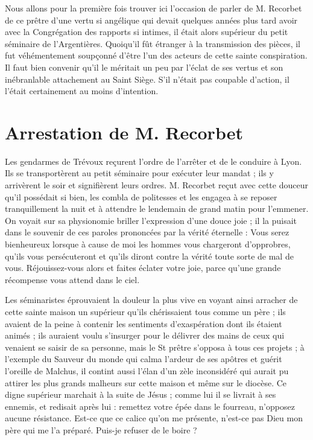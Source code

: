 Nous allons pour la première fois trouver ici l'occasion de parler de M. Recorbet de ce prêtre d'une vertu si angélique qui devait quelques années plus tard avoir avec la Congrégation des rapports si intimes, il était alors supérieur du petit séminaire de l'Argentières. Quoiqu'il fût étranger à la transmission des pièces, il fut véhémentement soupçonné d'être l'un des acteurs de cette sainte conspiration. Il faut bien convenir qu'il le méritait un peu par l'éclat de ses vertus et son inébranlable attachement au Saint Siège. S'il n'était pas coupable d'action, il l'était certainement au moins d'intention.

\section*{Arrestation de M. Recorbet}
Les gendarmes de Trévoux reçurent l'ordre de l'arrêter et de le conduire à Lyon. Ils se transportèrent au petit séminaire pour exécuter leur mandat ; ils y arrivèrent le soir et signifièrent leurs ordres. M. Recorbet reçut avec cette douceur qu'il possédait si bien, les combla de politesses et les engagea à se reposer tranquillement la nuit et à attendre le lendemain de grand matin pour l'emmener. On voyait sur sa physionomie briller l'expression d'une douce joie ; il la puisait dans le souvenir de ces paroles prononcées par la vérité éternelle : Vous serez bienheureux lorsque à cause de moi les hommes vous chargeront d'opprobres, qu'ils vous persécuteront et qu'ils diront contre la vérité toute sorte de mal de vous. Réjouissez-vous alors et faites éclater votre joie, parce qu'une grande récompense vous attend dans le ciel.

Les séminaristes éprouvaient la douleur la plus vive en voyant ainsi arracher de cette sainte maison un supérieur qu'ils chérissaient
tous comme un père ; ils avaient de la peine à contenir les sentiments d'exaspération dont ils étaient animés ; ils auraient voulu s'insurger pour le délivrer des mains de ceux qui venaient se saisir de sa personne, mais le St prêtre s'opposa à tous ces projets ; à l'exemple du Sauveur du monde qui calma l'ardeur de ses apôtres et guérit l'oreille de Malchus, il contint aussi l'élan d'un zèle inconsidéré qui aurait pu attirer les plus grands malheurs sur cette maison et même sur le diocèse. Ce digne supérieur marchait à la suite de Jésus ; comme lui il se livrait à ses ennemis, et redisait après lui : remettez votre épée dans le fourreau, n'opposez aucune résistance. Est-ce que ce calice qu'on me présente, n'est-ce pas Dieu mon père qui me l'a préparé. Puis-je refuser de le boire ?

